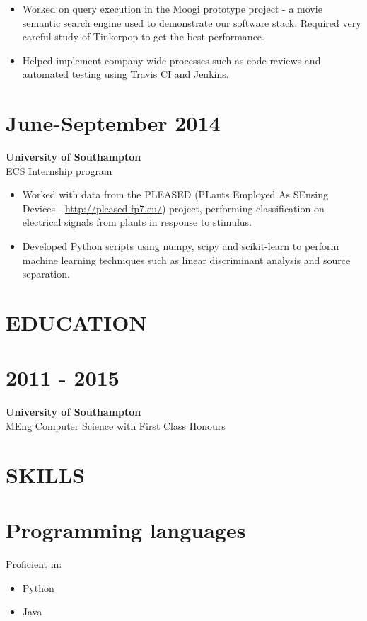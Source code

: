 \documentclass[margin]{res}
\begin{document}
\begin{resume}
\begin{itemize}
\item
Worked on query execution in the Moogi prototype project - a movie semantic search engine used to demonstrate our software stack. Required very careful study of Tinkerpop to get the best performance.

\item
Helped implement company-wide processes such as code reviews and automated testing using Travis CI and Jenkins.

\end{itemize}

\normalsize{\section{June-September 2014}}
{\bf University of Southampton} \\
ECS Internship program \\
\begin{itemize}
\item
Worked with data from the PLEASED
(PLants Employed As SEnsing Devices - \href{http://pleased-fp7.eu/}{http://pleased-fp7.eu/}) project, performing classification on electrical signals from plants in response to stimulus.
\item
Developed Python scripts using numpy, scipy and scikit-learn to perform machine learning techniques such as linear discriminant analysis and source separation.
\end{itemize}

\section{EDUCATION}
\normalsize{\section{2011 - 2015}}
{\bf University of Southampton} \\
MEng Computer Science with First Class Honours \\

\section{SKILLS}

\normalsize{\section{Programming languages}}
Proficient in:
\begin{itemize}
\item Python
\item Java
\end{itemize}


\end{resume}
\end{document}
